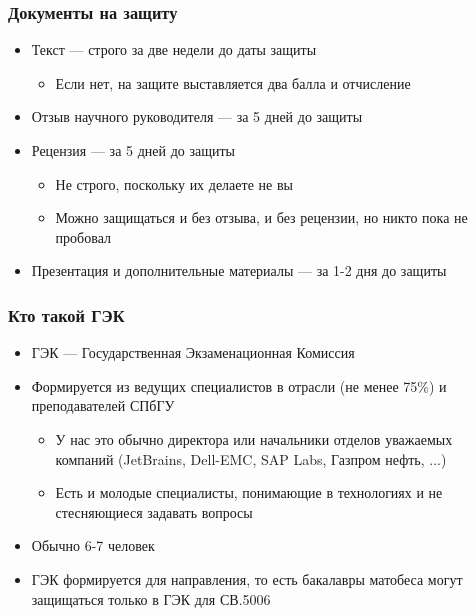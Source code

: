 \documentclass[xetex,mathserif,serif]{beamer}
\begin{document}
    \begin{frame}
        \frametitle{Документы на защиту}
        \begin{itemize}
            \item Текст --- строго за две недели до даты защиты
            \begin{itemize}
                \item Если нет, на защите выставляется два балла и отчисление
            \end{itemize}
            \item Отзыв научного руководителя --- за 5 дней до защиты
            \item Рецензия --- за 5 дней до защиты
            \begin{itemize}
                \item Не строго, поскольку их делаете не вы
                \item Можно защищаться и без отзыва, и без рецензии, но никто пока не пробовал
            \end{itemize}
            \item Презентация и дополнительные материалы --- за 1-2 дня до защиты
        \end{itemize}
    \end{frame}

    \begin{frame}
        \frametitle{Кто такой ГЭК}
        \begin{itemize}
            \item ГЭК --- Государственная Экзаменационная Комиссия
            \item Формируется из ведущих специалистов в отрасли (не менее 75\%) и преподавателей СПбГУ
            \begin{itemize}
                \item У нас это обычно директора или начальники отделов уважаемых компаний (JetBrains, Dell-EMC, SAP Labs, Газпром нефть, ...)
                \item Есть и молодые специалисты, понимающие в технологиях и не стесняющиеся задавать вопросы
            \end{itemize}
            \item Обычно 6-7 человек
            \item ГЭК формируется для направления, то есть бакалавры матобеса могут защищаться только в ГЭК для СВ.5006
        \end{itemize}
    \end{frame}
\end{document}
